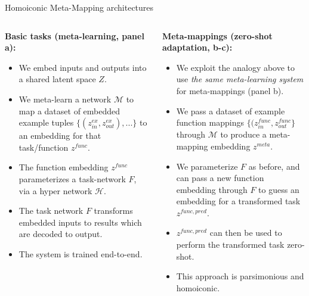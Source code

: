 \documentclass[final]{beamer}
\begin{document}
\begin{frame}[t]{}
\begin{columns}
\begin{column}[t]{0.496\textwidth}
\begin{block}{\huge Homoiconic Meta-Mapping architectures}
\vspace{-0.5em}
\begin{columns}
\begin{column}[t]{0.48\textwidth}
\textbf{Basic tasks (meta-learning, panel a):}
\begin{itemize}
\item We embed inputs and outputs into a shared latent space \(Z\). 
\item We meta-learn a network \(\mathcal{M}\) to map a dataset of embedded example tuples \(\{(z^{ex}_{in}, z^{ex}_{out}), ...\}\) to an embedding for that task/function \(z^{func}\). 
\item The function embedding \(z^{func}\) parameterizes a task-network \(F\), via a hyper network \(\mathcal{H}\).
\item The task network \(F\) transforms embedded inputs to results which are decoded to output.
\item The system is trained end-to-end.
\end{itemize}
\end{column}
\begin{column}[t]{0.48\textwidth}
\textbf{Meta-mappings (zero-shot adaptation, b-c):}
\begin{itemize}
\item We exploit the analogy above to use \emph{the same meta-learning system} for meta-mappings (panel b).
\item We pass a dataset of example function mappings \(\{(z^{func}_{in}, z^{func}_{out}\}\) through \(\mathcal{M}\) to produce a meta-mapping embedding \(z^{meta}\). 
\item We parameterize \(F\) as before, and can pass a new function embedding through \(F\) to guess an embedding for a transformed task \(z^{func,pred}\).
\item \(z^{func,pred}\) can then be used to perform the transformed task zero-shot.
\item This approach is parsimonious and homoiconic.
\end{itemize}
\end{column}
\end{columns}
\vspace{0.4em}
\begin{figure}[H]
\centering
\normalsize
{}
\end{figure}
\end{block}
\end{column}
\end{columns}
\end{frame}
\end{document}
